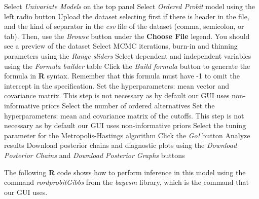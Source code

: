 \begin{algorithm}[h!]
	\caption{Ordered probit models}\label{alg:OrderedProbit}
	\begin{algorithmic}[1]  		 			
		\State Select \textit{Univariate Models} on the top panel
		\State Select \textit{Ordered Probit} model using the left radio button
		\State Upload the dataset selecting first if there is header in the file, and the kind of separator in the \textit{csv} file of the dataset (comma, semicolon, or tab). Then, use the \textit{Browse} button under the \textbf{Choose File} legend. You should see a preview of the dataset
		\State Select MCMC iterations, burn-in and thinning parameters using the \textit{Range sliders}
		\State Select dependent and independent variables using the \textit{Formula builder} table
		\State Click the \textit{Build formula} button to generate the formula in \textbf{R} syntax. Remember that this formula must have -1 to omit the intercept in the specification.
		\State Set the hyperparameters: mean vector and covariance matrix. This step is not necessary as by default our GUI uses non-informative priors
		\State Select the number of ordered alternatives
		\State Set the hyperparameters: mean and covariance matrix of the cutoffs. This step is not necessary as by default our GUI uses non-informative priors 
		\State Select the tuning parameter for the Metropolis-Hastings algorithm 
		\State Click the \textit{Go!} button
		\State Analyze results
		\State Download posterior chains and diagnostic plots using the \textit{Download Posterior Chains} and \textit{Download Posterior Graphs} buttons
	\end{algorithmic} 
\end{algorithm}

The following \textbf{R} code shows how to perform inference in this model using the command \textit{rordprobitGibbs} from the \textit{bayesm} library, which is the command that our GUI uses.

